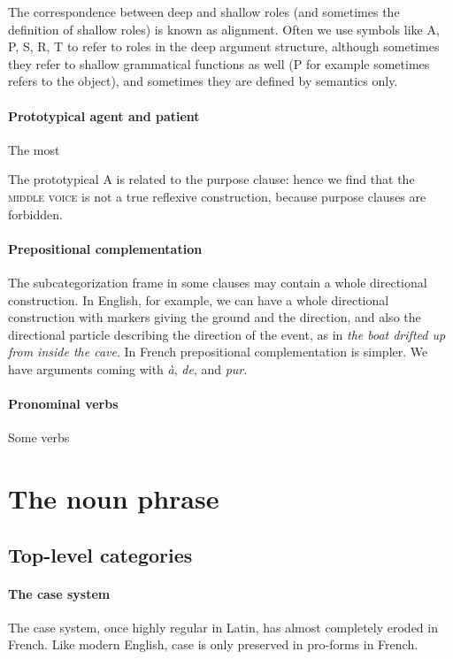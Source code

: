 \documentclass[a4paper, oneside, 12pt]{report}
\newcommand{\form}[1]{\emph{#1}}
\newcommand*{\category}[1]{\textsc{#1}}
\begin{document}
The correspondence between deep and shallow roles (and sometimes the definition of shallow roles) is known as alignment.
Often we use symbols like A, P, S, R, T to refer to roles in the deep argument structure,
although sometimes they refer to shallow grammatical functions as well
(P for example sometimes refers to the object),
and sometimes they are defined by semantics only.

\paragraph*{Prototypical agent and patient}
The most 

The prototypical A is related to the purpose clause:
hence we find that the \category{middle voice} is not a true reflexive construction,
because purpose clauses are forbidden.

\paragraph*{Prepositional complementation} 
The subcategorization frame in some clauses may contain a whole directional construction.
In English, for example, we can have a whole directional construction
with markers giving the ground and the direction,
and also the directional particle describing the direction of the event,
as in \form{the boat drifted up from inside the cave}.
In French prepositional complementation is simpler.
We have arguments coming with \form{à}, \form{de}, and \form{pur}.

\paragraph*{Pronominal verbs}
Some verbs 

\section{The noun phrase}

\subsection{Top-level categories}

\paragraph*{The case system}\label{sec:grammatical.np.peripheral.case}
The case system, once highly regular in Latin, has almost completely eroded in French.
Like modern English, case is only preserved in pro-forms in French.
\end{document}
